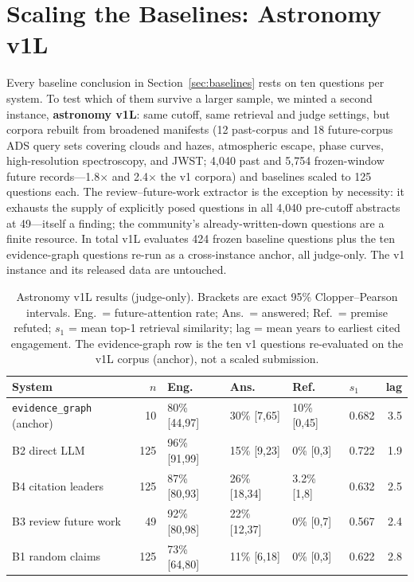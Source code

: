 \section{Scaling the Baselines: Astronomy v1L}
\label{sec:scaled}

Every baseline conclusion in Section~\ref{sec:baselines} rests on ten
questions per system. To test which of them survive a larger sample, we
minted a second instance, \textbf{astronomy v1L}: same cutoff, same
retrieval and judge settings, but corpora rebuilt from broadened
manifests (12 past-corpus and 18 future-corpus ADS query sets covering
clouds and hazes, atmospheric escape, phase curves, high-resolution
spectroscopy, and JWST; 4{,}040 past and 5{,}754 frozen-window future
records---1.8$\times$ and 2.4$\times$ the v1 corpora) and baselines
scaled to 125 questions each. The review--future-work extractor is the
exception by necessity: it exhausts the supply of explicitly posed
questions in all 4{,}040 pre-cutoff abstracts at 49---itself a finding;
the community's already-written-down questions are a finite resource.
In total v1L evaluates 424 frozen baseline questions plus the ten
evidence-graph questions re-run as a cross-instance anchor, all
judge-only. The v1 instance and its released data are untouched.

\begin{table}[t]
  \centering
  \small
  \caption{Astronomy v1L results (judge-only). Brackets are exact 95\%
  Clopper--Pearson intervals. Eng.\ = future-attention rate; Ans.\ =
  answered; Ref.\ = premise refuted; $s_1$ = mean top-1 retrieval
  similarity; lag = mean years to earliest cited engagement. The
  evidence-graph row is the ten v1 questions re-evaluated on the v1L
  corpus (anchor), not a scaled submission.}
  \label{tab:scaled}
  \begin{tabular}{@{}lrllllr@{}}
    \toprule
    System & $n$ & Eng. & Ans. & Ref. & $s_1$ & lag \\
    \midrule
    \texttt{evidence\_graph} (anchor) & 10 & 80\% [44,97] & 30\% [7,65] & 10\% [0,45] & 0.682 & 3.5 \\
    B2 direct LLM & 125 & 96\% [91,99] & 15\% [9,23] & 0\% [0,3] & 0.722 & 1.9 \\
    B4 citation leaders & 125 & 87\% [80,93] & 26\% [18,34] & 3.2\% [1,8] & 0.632 & 2.5 \\
    B3 review future work & 49 & 92\% [80,98] & 22\% [12,37] & 0\% [0,7] & 0.567 & 2.4 \\
    B1 random claims & 125 & 73\% [64,80] & 11\% [6,18] & 0\% [0,3] & 0.622 & 2.8 \\
    \bottomrule
  \end{tabular}
\end{table}

